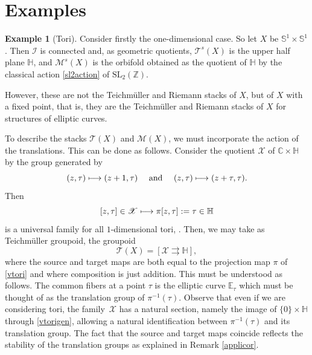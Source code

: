 \documentclass[JEP,XML,SOM,Unicode]{cedram}
\let\mathcal\mathscr
\def\mto{\mathchoice{\longmapsto}{\mapsto}{\mapsto}{\mapsto}}
\newcommand{\SL}{\mathrm{SL}}
\theoremstyle{plain}
\theoremstyle{definition}
\newtheorem{example}[theorem]{Example}
\theoremstyle{remark}
\numberwithin{equation}{section}
\newcommand{\CC}{{\mathbb{C}}}
\newcommand{\cI}{\mathcal{I}}
\begin{document}
\section{Examples}
\label{examples}
\begin{example}[Tori]
\label{tori}
Consider firstly the one-dimensional case. So let $X$ be $\mathbb S^1\times\mathbb S^1$. Then $\cI$ is connected and, as geometric quotients, $\mathcal T^s(X)$ is the upper half plane $\mathbb H$, and $\mathcal M^s(X)$ is the orbifold obtained as the quotient of $\mathbb H$ by the classical action \eqref{sl2action} of $\SL_2(\mathbb Z)$.

However, these are not the Teichmüller and Riemann stacks of $X$, but of $X$ with a fixed point, that is, they are the Teichmüller and Riemann stacks of $X$ for structures of elliptic curves.

To describe the stacks $\mathcal T(X)$ and $\mathcal M(X)$, we must incorporate the action of the translations. This can be done as follows. Consider the quotient $\mathcal X$ of $\CC\times\mathbb H$ by the group generated by
\begin{equation}
\label{vtorigen}
(z,\tau)\mto (z+1,\tau)\quad\text{ and }\quad (z,\tau)\mto (z+\tau,\tau).
\end{equation}
Then
\begin{equation}
\label{vtori}
[z,\tau]\in\mathcal X\mto \pi [z,\tau]:=\tau\in\mathbb H
\end{equation}
is a universal family for all $1$-dimensional tori, \cf \cite[p.\,18--19]{MK}. Then, we may take as Teichmüller groupoid, the groupoid
\begin{equation}
\label{toriTgroupoid}
\mathcal T(X)=\left [\mathcal X\rightrightarrows \mathbb H\right],
\end{equation}
where the source and target maps are both equal to the projection map $\pi$ of \eqref{vtori} and where composition is just addition. This must be understood as follows. The common fibers at a point $\tau$ is the elliptic curve $\mathbb E_\tau$ which must be thought of as the translation group of $\pi^{-1}(\tau)$. Observe that even if we are considering tori, the family~$\mathcal X$ has a natural section, namely the image of $\{0\}\times \mathbb H$ through \eqref{vtorigen}, allowing a natural identification between $\pi^{-1}(\tau)$ and its translation group. The fact that the source and target maps coincide reflects the stability of the translation groups as explained in Remark \ref{applicor}.


\end{example}
\end{document}
